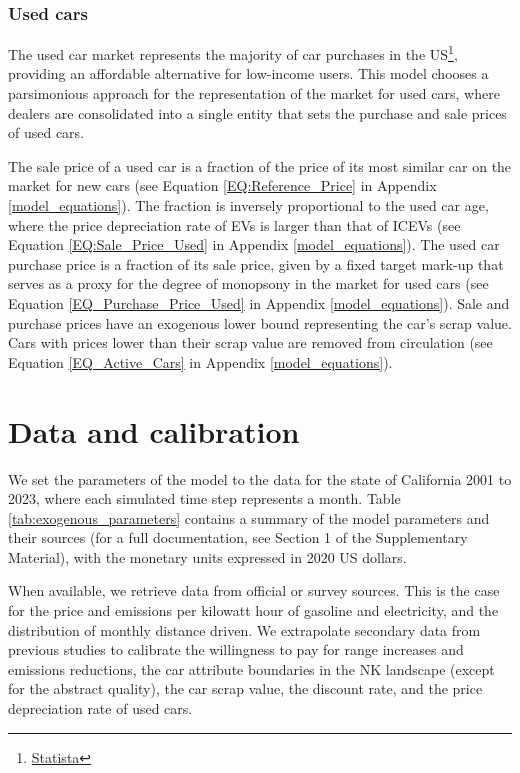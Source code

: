 \documentclass[12pt]{article}
\begin{document}
	\subsubsection{Used cars} \label{Model:Used_Cars}
    The used car market represents the majority of car purchases in the US\footnote{\href{https://www.statista.com/statistics/183713/value-of-us-passenger-cas-sales-and-leases-since-1990/}{Statista}}, providing an affordable alternative for low-income users. This model chooses a parsimonious approach for the representation of the market for used cars, where dealers are consolidated into a single entity that sets the purchase and sale prices of used cars.

	The sale price of a used car is a fraction of the price of its most similar car on the market for new cars (see Equation \ref{EQ:Reference_Price} in Appendix \ref{model_equations}). The fraction is inversely proportional to the used car age, where the price depreciation rate of EVs is larger than that of ICEVs \citep{SCHLOTER20222Depreciation} (see Equation \ref{EQ:Sale_Price_Used} in Appendix \ref{model_equations}). The used car purchase price is a fraction of its sale price, given by a fixed target mark-up that serves as a proxy for the degree of monopsony in the market for used cars (see Equation \ref{EQ_Purchase_Price_Used} in Appendix \ref{model_equations}). Sale and purchase prices have an exogenous lower bound representing the car's scrap value. Cars with prices lower than their scrap value are removed from circulation (see Equation \ref{EQ_Active_Cars} in Appendix \ref{model_equations}).

	\section{Data and calibration} \label{Sec_Cal_Val}
	We set the parameters of the model to the data for the state of California 2001 to 2023, where each simulated time step represents a month. Table \ref{tab:exogenous_parameters} contains a summary of the model parameters and their sources (for a full documentation, see Section 1 of the Supplementary Material), with the monetary units expressed in 2020 US dollars.

    When available, we retrieve data from official or survey sources. This is the case for the price and emissions per kilowatt hour of gasoline and electricity, and the distribution of monthly distance driven. We extrapolate secondary data from previous studies to calibrate the willingness to pay for range increases and emissions reductions, the car attribute boundaries in the NK landscape (except for the abstract quality), the car scrap value, the discount rate, and the price depreciation rate of used cars.
\end{document}
